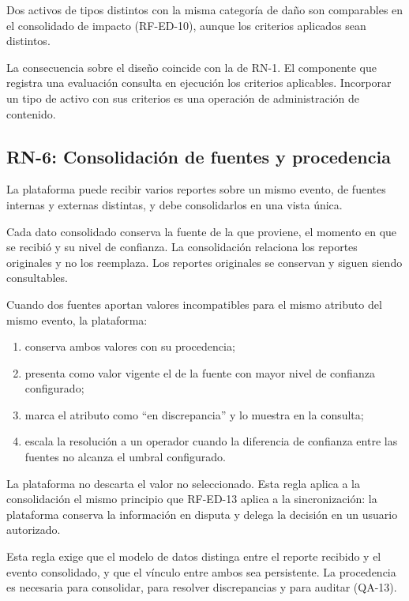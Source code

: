 \documentclass[11pt,letterpaper]{article}
\begin{document}
Dos activos de tipos distintos con la misma categoría de daño son comparables en el consolidado de
impacto (RF-ED-10), aunque los criterios aplicados sean distintos.

La consecuencia sobre el diseño coincide con la de RN-1. El componente que registra una evaluación
consulta en ejecución los criterios aplicables. Incorporar un tipo de activo con sus criterios es
una operación de administración de contenido.

\subsection{RN-6: Consolidación de fuentes y procedencia}

La plataforma puede recibir varios reportes sobre un mismo evento, de fuentes internas y externas
distintas, y debe consolidarlos en una vista única.

Cada dato consolidado conserva la fuente de la que proviene, el momento en que se recibió y su nivel
de confianza. La consolidación relaciona los reportes originales y no los reemplaza. Los reportes
originales se conservan y siguen siendo consultables.

Cuando dos fuentes aportan valores incompatibles para el mismo atributo del mismo evento, la
plataforma:

\begin{enumerate}
  \item conserva ambos valores con su procedencia;
  \item presenta como valor vigente el de la fuente con mayor nivel de confianza configurado;
  \item marca el atributo como \enquote{en discrepancia} y lo muestra en la consulta;
  \item escala la resolución a un operador cuando la diferencia de confianza entre las fuentes no
        alcanza el umbral configurado.
\end{enumerate}

La plataforma no descarta el valor no seleccionado. Esta regla aplica a la consolidación el mismo
principio que RF-ED-13 aplica a la sincronización: la plataforma conserva la información en disputa
y delega la decisión en un usuario autorizado.

Esta regla exige que el modelo de datos distinga entre el reporte recibido y el evento consolidado,
y que el vínculo entre ambos sea persistente. La procedencia es necesaria para consolidar, para
resolver discrepancias y para auditar (QA-13).
\end{document}
